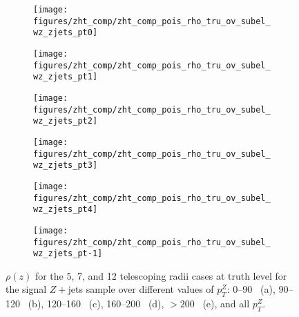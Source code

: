 \begin{figure}[!htbp]\captionsetup{justification=centering}
\begin{center}
\begin{subfigure}[t]{16pc}\centering\texttt{[image: figures/zht\_comp/zht\_comp\_pois\_rho\_tru\_ov\_subel\_wz\_zjets\_pt0]}\caption{}\end{subfigure}
\begin{subfigure}[t]{16pc}\centering\texttt{[image: figures/zht\_comp/zht\_comp\_pois\_rho\_tru\_ov\_subel\_wz\_zjets\_pt1]}\caption{}\end{subfigure}
\begin{subfigure}[t]{16pc}\centering\texttt{[image: figures/zht\_comp/zht\_comp\_pois\_rho\_tru\_ov\_subel\_wz\_zjets\_pt2]}\caption{}\end{subfigure}
\begin{subfigure}[t]{16pc}\centering\texttt{[image: figures/zht\_comp/zht\_comp\_pois\_rho\_tru\_ov\_subel\_wz\_zjets\_pt3]}\caption{}\end{subfigure}
\begin{subfigure}[t]{16pc}\centering\texttt{[image: figures/zht\_comp/zht\_comp\_pois\_rho\_tru\_ov\_subel\_wz\_zjets\_pt4]}\caption{}\end{subfigure}
\begin{subfigure}[t]{16pc}\centering\texttt{[image: figures/zht\_comp/zht\_comp\_pois\_rho\_tru\_ov\_subel\_wz\_zjets\_pt-1]}\caption{}\end{subfigure}
\caption{\label{fig:comprhozjetstru} $\rho\left(z\right)$ for the 5, 7, and 12 telescoping radii cases at truth level for the signal $Z+$jets sample over different values of $p_T^Z$: 0--90 \GeV\ (a), 90--120 \GeV\ (b), 120--160 \GeV\ (c), 160--200 \GeV\ (d), $>200$ \GeV\ (e), and all $p_T^Z$.}
\end{center}
\end{figure}
\clearpage

